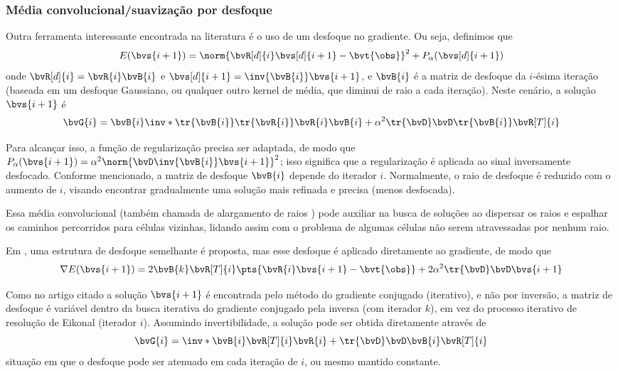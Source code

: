 \subsubsection{Média convolucional/suavização por desfoque}

Outra ferramenta interessante encontrada na literatura \cite{phillips_traveltime_1991,meyerholtz_convolutional_1989} é o uso de um desfoque no gradiente. Ou seja, definimos que
\begin{equation}	
	E(\bvs{i+1}) = \norm{\bvR[d]{i} \bvs[d]{i+1} - \bvt{\obs}}^2 + P_\alpha(\bvs[d]{i+1})
\end{equation}
onde $\bvR[d]{i} = \bvR{i}\bvB{i}$ e $\bvs[d]{i+1} = \inv{\bvB{i}} \bvs{i+1}$, e $\bvB{i}$ é a matriz de desfoque da $i$-ésima iteração (baseada em um desfoque Gaussiano, ou qualquer outro kernel de média, que diminui de raio a cada iteração). Neste cenário, a solução $\bvs{i+1}$ é
\begin{equation}	
	\bvG{i} = \bvB{i} \inv*{\tr{\bvB{i}} \tr{\bvR{i}} \bvR{i} \bvB{i} + \alpha^2 \tr{\bvD}\bvD} \tr{\bvB{i}} \bvR[T]{i}
\end{equation}

Para alcançar isso, a função de regularização precisa ser adaptada, de modo que $P_{\alpha}(\bvs{i+1}) = \alpha^2 \norm{\bvD \inv{\bvB{i}} \bvs{i+1}}^2$; isso significa que a regularização é aplicada ao sinal inversamente desfocado. Conforme mencionado, a matriz de desfoque $\bvB{i}$ depende do iterador $i$. Normalmente, o raio de desfoque é reduzido com o aumento de $i$, visando encontrar gradualmente uma solução mais refinada e precisa (menos desfocada).

Essa média convolucional (também chamada de alargamento de raios \cite{meyerholtz_convolutional_1989,phillips_traveltime_1991}) pode auxiliar na busca de soluções ao dispersar os raios e espalhar os caminhos percorridos para células vizinhas, lidando assim com o problema de algumas células não serem atravessadas por nenhum raio.

Em \cite{ali_opensource_2019}, uma estrutura de desfoque semelhante é proposta, mas esse desfoque é aplicado diretamente ao gradiente, de modo que
\begin{equation}	
	\nabla E(\bvs{i+1}) = 2 \bvB{k} \bvR[T]{i}\pts{\bvR{i} \bvs{i+1} - \bvt{\obs}} + 2 \alpha^2 \tr{\bvD}\bvD \bvs{i+1}
\end{equation}

Como no artigo citado a solução $\bvs{i+1}$ é encontrada pelo método do gradiente conjugado (iterativo), e não por inversão, a matriz de desfoque é variável dentro da busca iterativa do gradiente conjugado pela inversa (com iterador $k$), em vez do processo iterativo de resolução de Eikonal (iterador $i$). Assumindo invertibilidade, a solução pode ser obtida diretamente através de
\begin{equation}		
	\bvG{i} = \inv*{\bvB{i} \bvR[T]{i} \bvR{i} + \tr{\bvD}\bvD}\bvB{i} \bvR[T]{i}
\end{equation}
situação em que o desfoque pode ser atenuado em cada iteração de $i$, ou mesmo mantido constante.

